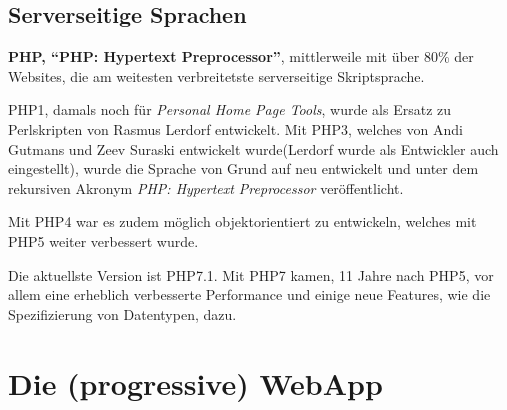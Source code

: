 \documentclass[a4paper,12pt,ngerman,listof=numbered]{scrartcl}      %
\let\oldcite\cite
\renewcommand{\cite}[1]{\textsuperscript{\oldcite{#1}}}
\newcommand{\spacer}{\par\bigskip\noindent}
\begin{document}
	\subsection{Serverseitige Sprachen}
	
	\spacer\textbf{PHP, ``PHP: Hypertext Preprocessor''}, mittlerweile mit über 80\% der Websites, die am weitesten verbreitetste serverseitige Skriptsprache.\cite{phpCoverage}\par
	PHP1, damals noch für \emph{Personal Home Page Tools}, wurde als Ersatz zu Perlskripten von Rasmus Lerdorf entwickelt. Mit PHP3, welches von Andi Gutmans und Zeev Suraski entwickelt wurde(Lerdorf wurde als Entwickler auch eingestellt), wurde die Sprache von Grund auf neu entwickelt und unter dem rekursiven Akronym \emph{PHP: Hypertext Preprocessor} veröffentlicht.\par
	Mit PHP4 war es zudem möglich objektorientiert zu entwickeln, welches mit PHP5 weiter verbessert wurde.\par
	Die aktuellste Version ist PHP7.1. Mit PHP7 kamen, 11 Jahre nach PHP5, vor allem eine erheblich verbesserte Performance und einige neue Features, wie die Spezifizierung von Datentypen, dazu.\cite{phpWiki}\par
	
	\newpage
	\section{Die (progressive) WebApp}
\end{document}
